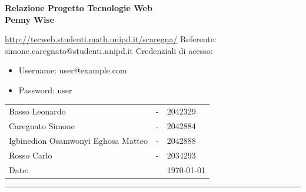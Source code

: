 \begin{titlepage}
\noindent{}
\vspace{15pt}
\textcolor{UM_Brown}{
\begin{flushleft}
    \textbf{\huge{Relazione Progetto Tecnologie Web}}\\
    \vspace{15pt}
    \huge \textbf{Penny Wise} \\
    \vspace{15pt}
	\begin{large}
    \url{http://tecweb.studenti.math.unipd.it/scaregna/}
	\newline
    Referente: simone.caregnato@studenti.unipd.it
	\newline
	Credenziali di acesso:
		\begin{itemize}
			\item[] Username: user@example.com
			\item[] Password: user
		\end{itemize}
	\end{large}
\end{flushleft}
}
\vspace{55pt}
\textcolor{UM_Brown}{
\begin{flushright}
\begin{tabular}{lcl}
    Basso Leonardo & - & 2042329 \\
    Caregnato Simone & - & 2042884 \\
    Igbinedion Osamwonyi Eghosa Matteo & - & 2042888 \\
    Rosso Carlo & - & 2034293 \\
    Date: &  & \today
\end{tabular}
\end{flushright}
\hrule
}
\end{titlepage}
